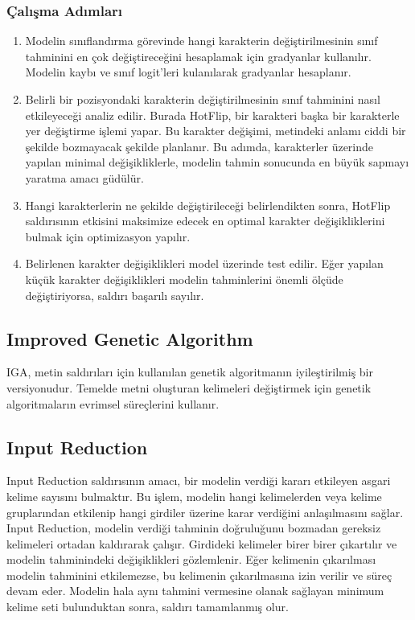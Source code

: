 \subsubsection{Çalışma Adımları}

\begin{enumerate}
    \item Modelin sınıflandırma görevinde hangi karakterin değiştirilmesinin sınıf tahminini en çok değiştireceğini hesaplamak için gradyanlar kullanılır. Modelin kaybı ve sınıf logit'leri kulanılarak gradyanlar hesaplanır.
    \item Belirli bir pozisyondaki karakterin değiştirilmesinin sınıf tahminini nasıl etkileyeceği analiz edilir. Burada HotFlip, bir karakteri başka bir karakterle yer değiştirme işlemi yapar. Bu karakter değişimi, metindeki anlamı ciddi bir şekilde bozmayacak şekilde planlanır. Bu adımda, karakterler üzerinde yapılan minimal değişikliklerle, modelin tahmin sonucunda en büyük sapmayı yaratma amacı güdülür.
    \item Hangi karakterlerin ne şekilde değiştirileceği belirlendikten sonra, HotFlip saldırısının etkisini maksimize edecek en optimal karakter değişikliklerini bulmak için optimizasyon yapılır.
    \item Belirlenen karakter değişiklikleri model üzerinde test edilir. Eğer yapılan küçük karakter değişiklikleri modelin tahminlerini önemli ölçüde değiştiriyorsa, saldırı başarılı sayılır.
\end{enumerate}

\newpage

\subsection{Improved Genetic Algorithm}

IGA, metin saldırıları için kullanılan genetik algoritmanın iyileştirilmiş bir versiyonudur. Temelde metni oluşturan kelimeleri değiştirmek için genetik algoritmaların evrimsel süreçlerini kullanır.

\newpage

\subsection{Input Reduction}

Input Reduction saldırısının amacı, bir modelin verdiği kararı etkileyen asgari kelime sayısını bulmaktır. Bu işlem, modelin hangi kelimelerden veya kelime gruplarından etkilenip hangi girdiler üzerine karar verdiğini anlaşılmasını sağlar. Input Reduction, modelin verdiği tahminin doğruluğunu bozmadan gereksiz kelimeleri ortadan kaldırarak çalışır. Girdideki kelimeler birer birer çıkartılır ve modelin tahminindeki değişiklikleri gözlemlenir. Eğer kelimenin çıkarılması modelin tahminini etkilemezse, bu kelimenin çıkarılmasına izin verilir ve süreç devam eder. Modelin hala aynı tahmini vermesine olanak sağlayan minimum kelime seti bulunduktan sonra, saldırı tamamlanmış olur.

